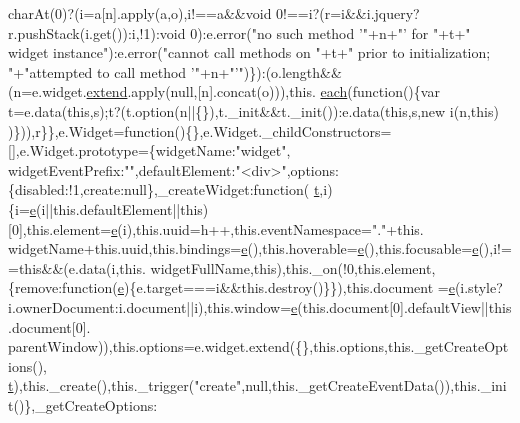 \begin{DoxyCode}
      charAt(0)?(i=a[n].apply(a,o),i!==a&&\textcolor{keywordtype}{void} 0!==i?(r=i&&i.jquery?r.pushStack(i.get()):i,!1):void 0):e.error(\textcolor{stringliteral}{"no
       such method '"}+n+\textcolor{stringliteral}{"' for "}+t+\textcolor{stringliteral}{" widget instance"}):e.error(\textcolor{stringliteral}{"cannot call methods on "}+t+\textcolor{stringliteral}{" prior to initialization; 
      "}+\textcolor{stringliteral}{"attempted to call method '"}+n+\textcolor{stringliteral}{"'"})\}):(o.length&&(n=e.widget.\hyperlink{jquery-2_80_83_8min_8js_a0203d523c2965441503d5f9d644f2c11}{extend}.apply(null,[n].concat(o))),this.
      \hyperlink{jquery-2_80_83_8min_8js_acac159895212e159f5cbd2080cc4d737}{each}(function()\{var t=e.data(\textcolor{keyword}{this},s);t?(t.option(n||\{\}),t.\_init&&t.\_init()):e.data(\textcolor{keyword}{this},s,\textcolor{keyword}{new} i(n,\textcolor{keyword}{this})
      )\})),r\}\},e.Widget=\textcolor{keyword}{function}()\{\},e.Widget.\_childConstructors=[],e.Widget.prototype=\{widgetName:\textcolor{stringliteral}{"widget"},
      widgetEventPrefix:\textcolor{stringliteral}{""},defaultElement:\textcolor{stringliteral}{"<div>"},options:\{disabled:!1,create:null\},\_createWidget:\textcolor{keyword}{function}(
      \hyperlink{jquery-2_80_83_8min_8js_aaccc9105df5383111407fd5b41255e23}{t},i)\{i=\hyperlink{jquery-ui_8min_8js_a2c038346d47955cbe2cb91e338edd7e1}{e}(i||this.defaultElement||\textcolor{keyword}{this})[0],this.element=\hyperlink{jquery-ui_8min_8js_a2c038346d47955cbe2cb91e338edd7e1}{e}(i),this.uuid=h++,this.eventNamespace=\textcolor{stringliteral}{"."}+this.
      widgetName+this.uuid,this.bindings=\hyperlink{jquery-ui_8min_8js_a2c038346d47955cbe2cb91e338edd7e1}{e}(),this.hoverable=\hyperlink{jquery-ui_8min_8js_a2c038346d47955cbe2cb91e338edd7e1}{e}(),this.focusable=\hyperlink{jquery-ui_8min_8js_a2c038346d47955cbe2cb91e338edd7e1}{e}(),i!==\textcolor{keyword}{this}&&(e.data(i,this.
      widgetFullName,\textcolor{keyword}{this}),this.\_on(!0,this.element,\{\textcolor{keyword}{remove}:\textcolor{keyword}{function}(\hyperlink{jquery-ui_8min_8js_a2c038346d47955cbe2cb91e338edd7e1}{e})\{e.target===i&&this.destroy()\}\}),this.document
      =\hyperlink{jquery-ui_8min_8js_a2c038346d47955cbe2cb91e338edd7e1}{e}(i.style?i.ownerDocument:i.document||i),this.window=\hyperlink{jquery-ui_8min_8js_a2c038346d47955cbe2cb91e338edd7e1}{e}(this.document[0].defaultView||this.document[0].
      parentWindow)),this.options=e.widget.extend(\{\},this.options,this.\_getCreateOptions(),
      \hyperlink{jquery-2_80_83_8min_8js_aaccc9105df5383111407fd5b41255e23}{t}),this.\_create(),this.\_trigger(\textcolor{stringliteral}{"create"},null,this.\_getCreateEventData()),this.\_init()\},\_getCreateOptions:

\end{DoxyCode}
